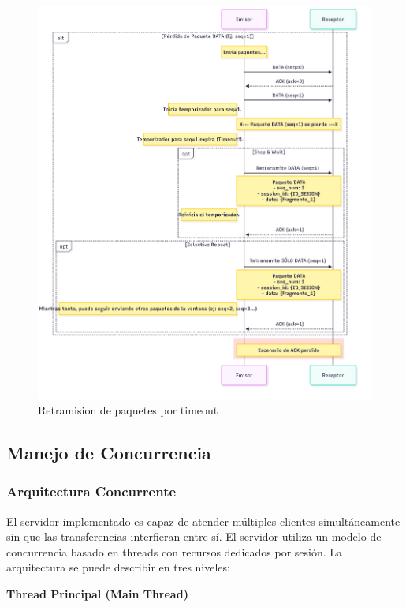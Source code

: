 \begin{figure}[H]
    \centering
    \includegraphics[width=1\linewidth]{images/RETRANSMISION}
    \caption{Retramision de paquetes por timeout}
    \label{fig:retransmision}
\end{figure}





\subsection{Manejo de Concurrencia}

\subsubsection{Arquitectura Concurrente}
El servidor implementado es capaz de atender múltiples clientes simultáneamente sin que las transferencias interfieran entre sí.
El servidor utiliza un modelo de concurrencia basado en threads con recursos dedicados por sesión. La arquitectura se puede describir en tres niveles:

\textbf{Thread Principal (Main Thread)}

